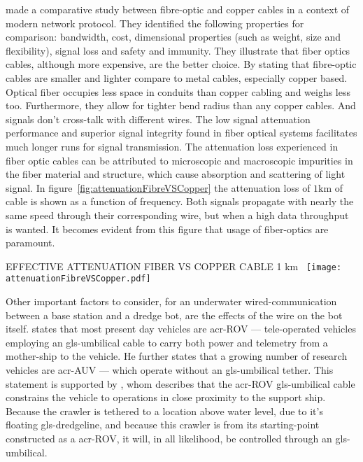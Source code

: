 \citet{babani_comparative_nodate} made a comparative study between fibre-optic and copper cables in a context of modern network protocol. They identified the following properties for comparison: bandwidth, cost, dimensional properties (such as weight, size and flexibility), signal loss and safety and immunity.
They illustrate that fiber optics cables, although more expensive, are the better choice. By stating that fibre-optic cables are smaller and lighter compare to metal cables, especially copper based. Optical fiber occupies less space in conduits than copper cabling and weighs less too. Furthermore, they allow for tighter bend radius than any copper cables. And signals don't cross-talk with different wires.
The low signal attenuation performance and superior signal integrity found in fiber optical systems facilitates much longer runs for signal transmission. The attenuation loss experienced in fiber optic cables can be attributed to microscopic and macroscopic impurities in the fiber material and structure, which cause absorption and scattering of light signal.
In figure~\ref{fig:attenuationFibreVSCopper} the attenuation loss of \( 1 \si{\km} \) of cable is shown as a function of frequency. Both signals propagate with nearly the same speed through their corresponding wire, but when a high data throughput is wanted. It becomes evident from this figure that usage of fiber-optics are paramount.

\begin{RoyalFigure}[htb, label=fig:attenuationFibreVSCopper]{EFFECTIVE ATTENUATION FIBER VS COPPER CABLE 1 km~\cite{joseph_c_palais_fibre_1998}}
  \texttt{[image: attenuationFibreVSCopper.pdf]}
\end{RoyalFigure}

Other important factors to consider, for an underwater wired-communication between a base station and a dredge bot, are the effects of the wire on the bot itself. \citet{whitcomb_underwater_2000} states that most present day vehicles are \gls{acr-ROV} --- tele-operated vehicles  employing an \gls{gls-umbilical} cable to carry both power and telemetry from a mother-ship to the vehicle.
He further states that a growing number of research vehicles are \gls{acr-AUV} --- which operate without an \gls{gls-umbilical} tether. This statement is supported by \citet{valavanis_control_1997}, whom describes that the \gls{acr-ROV} \gls{gls-umbilical} cable constrains the vehicle to operations in close proximity to the support ship.
Because the crawler is tethered to a location above water level, due to it's floating \gls{gls-dredgeline}, and because this crawler is from its starting-point constructed as a \gls{acr-ROV}, it will, in all likelihood, be controlled through an \gls{gls-umbilical}.


